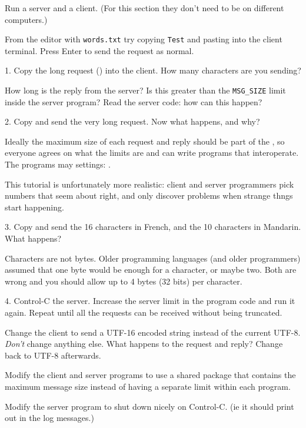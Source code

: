 Run a server and a client. (For this section they don't need to be on different
computers.)

From the editor with \texttt{words.txt} try copying \texttt{Test} and pasting into
the client terminal. Press Enter to send the request as normal.

1. Copy the long request () into the client. How many characters
are you sending?

How long is the reply from the server? Is this greater than the \texttt{MSG\_SIZE}
limit inside the server program? Read the server code: how can this happen?

2. Copy and send the very long request. Now what happens, and why?

\begin{IMPORTANT}
Ideally the maximum size of each request and reply should be part of the , so everyone agrees on what the limits are and can write programs that
interoperate. The programs may  settings:  .

This tutorial is unfortunately more realistic: client and server programmers pick
numbers that seem about right, and only discover problems when strange thngs start
happening.
\end{IMPORTANT}

3. Copy and send the 16 characters in French, and the 10 characters in Mandarin.
What happens?

\begin{IMPORTANT}
Characters are not bytes. Older programming languages (and older programmers) assumed
that one byte would be enough for a character, or maybe two. Both are wrong and you
should allow up to 4 bytes (32 bits) per character.
\end{IMPORTANT}

4. Control-C the server. Increase the server limit in the program code and run it
again. Repeat until all the requests can be received without being truncated.



Change the client  to send a UTF-16 encoded string instead of the
current UTF-8. \emph{Don't} change anything else. What happens to the request and
reply? Change back to UTF-8 afterwards.

Modify the client and server programs to use a shared package that contains the
maximum message size instead of having a separate limit within each program.

Modify the server program to shut down nicely on Control-C. (ie it should print out
 in the log messages.)


\COPYRIGHT


